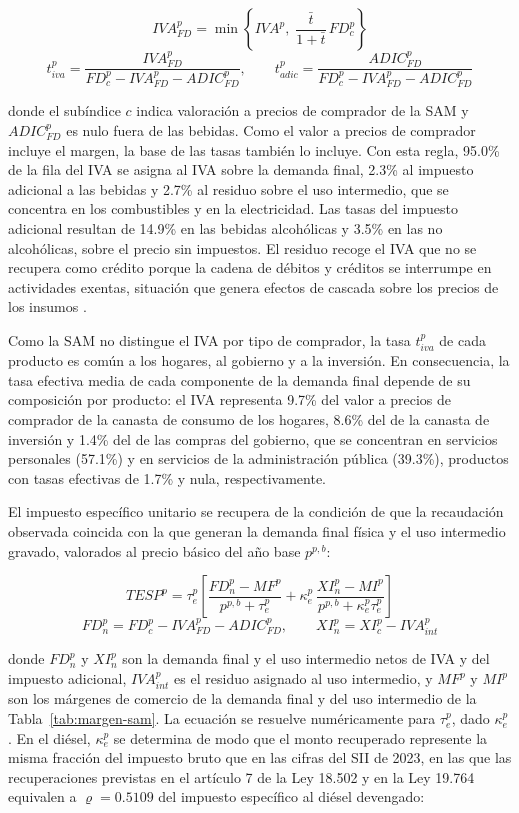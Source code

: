 \documentclass[11pt]{article}
\begin{document}
\[
IVA^{p}_{FD}=\min\left\{IVA^{p},\;\frac{\bar{t}}{1+\bar{t}}\,FD^{p}_{c}\right\}
\]
\[
t_{iva}^{p}=\frac{IVA^{p}_{FD}}{FD^{p}_{c}-IVA^{p}_{FD}-ADIC^{p}_{FD}},
\qquad
t_{adic}^{p}=\frac{ADIC^{p}_{FD}}{FD^{p}_{c}-IVA^{p}_{FD}-ADIC^{p}_{FD}}
\]

donde el subíndice $c$ indica valoración a precios de comprador de la SAM y $ADIC^{p}_{FD}$ es nulo fuera de las bebidas. Como el valor a precios de comprador incluye el margen, la base de las tasas también lo incluye. Con esta regla, 95.0\% de la fila del IVA se asigna al IVA sobre la demanda final, 2.3\% al impuesto adicional a las bebidas y 2.7\% al residuo sobre el uso intermedio, que se concentra en los combustibles y en la electricidad. Las tasas del impuesto adicional resultan de 14.9\% en las bebidas alcohólicas y 3.5\% en las no alcohólicas, sobre el precio sin impuestos. El residuo recoge el IVA que no se recupera como crédito porque la cadena de débitos y créditos se interrumpe en actividades exentas, situación que genera efectos de cascada sobre los precios de los insumos \cite{ebrill_etal_2001,keen_2013}.

Como la SAM no distingue el IVA por tipo de comprador, la tasa $t_{iva}^{p}$ de cada producto es común a los hogares, al gobierno y a la inversión. En consecuencia, la tasa efectiva media de cada componente de la demanda final depende de su composición por producto: el IVA representa 9.7\% del valor a precios de comprador de la canasta de consumo de los hogares, 8.6\% del de la canasta de inversión y 1.4\% del de las compras del gobierno, que se concentran en servicios personales (57.1\%) y en servicios de la administración pública (39.3\%), productos con tasas efectivas de 1.7\% y nula, respectivamente.

El impuesto específico unitario se recupera de la condición de que la recaudación observada coincida con la que generan la demanda final física y el uso intermedio gravado, valorados al precio básico del año base $p^{p,b}$:

\[
TESP^{p}=\tau_{e}^{p}\left[\frac{FD^{p}_{n}-MF^{p}}{p^{p,b}+\tau_{e}^{p}}+\kappa_{e}^{p}\,\frac{XI^{p}_{n}-MI^{p}}{p^{p,b}+\kappa_{e}^{p}\tau_{e}^{p}}\right]
\]
\[
FD^{p}_{n}=FD^{p}_{c}-IVA^{p}_{FD}-ADIC^{p}_{FD},
\qquad
XI^{p}_{n}=XI^{p}_{c}-IVA^{p}_{int}
\]

donde $FD^{p}_{n}$ y $XI^{p}_{n}$ son la demanda final y el uso intermedio netos de IVA y del impuesto adicional, $IVA^{p}_{int}$ es el residuo asignado al uso intermedio, y $MF^{p}$ y $MI^{p}$ son los márgenes de comercio de la demanda final y del uso intermedio de la Tabla~\ref{tab:margen-sam}. La ecuación se resuelve numéricamente para $\tau_{e}^{p}$, dado $\kappa_{e}^{p}$. En el diésel, $\kappa_{e}^{p}$ se determina de modo que el monto recuperado represente la misma fracción del impuesto bruto que en las cifras del SII de 2023, en las que las recuperaciones previstas en el artículo 7 de la Ley 18.502 y en la Ley 19.764 equivalen a $\varrho=0.5109$ del impuesto específico al diésel devengado:
\end{document}
